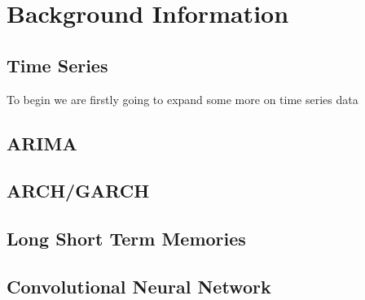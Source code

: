 \chapter{Background Information}
\section*{Time Series}
To begin we are firstly going to expand some more on time series data
\section*{ARIMA}
\section*{ARCH/GARCH}
\section*{Long Short Term Memories}
\section*{Convolutional Neural Network}